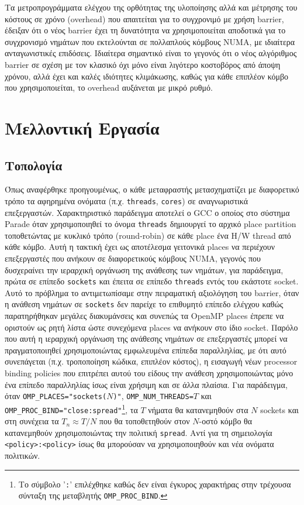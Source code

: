 Τα μετροπρογράμματα ελέγχου της ορθότητας της υλοποίησης αλλά και μέτρησης του κόστους σε χρόνο (overhead) που απαιτείται για το συγχρονιμό με χρήση barrier, έδειξαν ότι ο νέος barrier έχει τη δυνατότητα να χρησιμοποιείται αποδοτικά για το συγχρονισμό νημάτων που εκτελούνται σε πολλαπλούς κόμβους NUMA, με ιδιαίτερα ανταγωνιστικές επιδόσεις. Ιδιαίτερα σημαντικό είναι το γεγονός ότι ο νέος αλγόριθμος barrier σε σχέση με τον κλασικό όχι μόνο είναι λιγότερο κοστοβόρος από άποψη χρόνου, αλλά έχει και καλές ιδιότητες κλιμάκωσης, καθώς για κάθε επιπλέον κόμβο που χρησιμοποιείται, το overhead αυξάνεται με μικρό ρυθμό.


\section{Μελλοντική Εργασία}

\subsection{Τοπολογία}
Όπως αναφέρθηκε προηγουμένως, ο κάθε μεταφραστής μετασχηματίζει με διαφορετικό τρόπο τα αφηρημένα ονόματα (π.χ. \texttt{threads}, \texttt{cores}) σε αναγνωριστικά επεξεργαστών. Χαρακτηριστικό παράδειγμα αποτελεί ο GCC ο οποίος στο σύστημα Parade όταν χρησιμοποιηθεί το όνομα \texttt{threads} δημιουργεί το αρχικό place partition τοποθετώντας με κυκλικό τρόπο (round-robin) σε κάθε place ένα H/W thread από κάθε κόμβο. Αυτή η τακτική έχει ως αποτέλεσμα γειτονικά places να περιέχουν επεξεργαστές που ανήκουν σε διαφορετικούς κόμβους NUMA, γεγονός που δυσχεραίνει την ιεραρχική οργάνωση της ανάθεσης των νημάτων, για παράδειγμα, πρώτα σε επίπεδο \texttt{sockets} και έπειτα σε επίπεδο \texttt{threads} εντός του εκάστοτε socket. Αυτό το πρόβλημα το αντιμετωπίσαμε στην πειραματική αξιολόγηση του barrier, όταν η ανάθεση νημάτων σε \texttt{sockets} δεν παρείχε το επιθυμητό επίπεδο ελέγχου καθώς παρατηρήθηκαν μεγάλες διακυμάνσεις και συνεπώς τα OpenMP places έπρεπε να οριστούν ως ρητή λίστα ώστε συνεχόμενα places να ανήκουν στο ίδιο socket. Παρόλο που αυτή η ιεραρχική οργάνωση της ανάθεσης νημάτων σε επεξεργαστές μπορεί να πραγματοποιηθεί χρησιμοποιώντας εμφωλευμένα επίπεδα παραλληλίας, με ότι αυτό συνεπάγεται (π.χ. τροποποίηση κώδικα, επιπλέον κόστος), η εισαγωγή νέων processor binding policies που επιτρέπει αυτού του είδους την ανάθεση χρησιμοποιώντας μόνο ένα επίπεδο παραλληλίας ίσως είναι χρήσιμη και σε άλλα πλαίσια. Για παράδειγμα, όταν \texttt{OMP\_PLACES="sockets($N$)"}, \texttt{OMP\_NUM\_THREADS=$T$} και \texttt{OMP\_PROC\_BIND="close:spread"}\footnote{Το σύμβολο '\texttt{:}' επιλέχθηκε καθώς δεν είναι έγκυρος χαρακτήρας στην τρέχουσα σύνταξη της μεταβλητής \texttt{OMP\_PROC\_BIND}.}, τα $T$ νήματα θα κατανεμηθούν στα $N$ sockets και στη συνέχεια τα $T_n \approx T / N$ που θα τοποθετηθούν στον $N$-οστό κόμβο θα κατανεμηθούν χρησιμοποιώντας την πολιτική \texttt{spread}. Αντί για τη σημειολογία \texttt{<policy>:<policy>} ίσως θα μπορούσαν να χρησιμοποιηθούν και νέα ονόματα πολιτικών.

